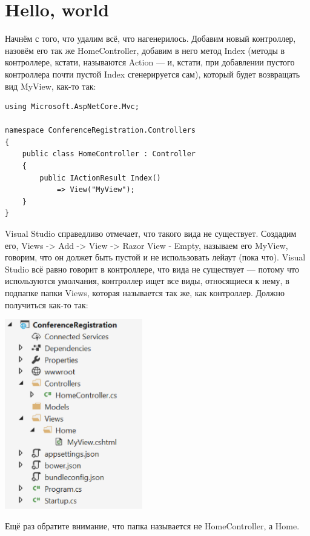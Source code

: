 \documentclass[a5paper]{article}
\begin{document}
\section{Hello, world}

Начнём с того, что удалим всё, что нагенерилось. Добавим новый контроллер, назовём его так же HomeController, добавим в него метод Index (методы в контроллере, кстати, называются Action --- и, кстати, при добавлении пустого контроллера почти пустой Index сгенерируется сам), который будет возвращать вид MyView, как-то так:

\begin{verbatim}
using Microsoft.AspNetCore.Mvc;

namespace ConferenceRegistration.Controllers
{
    public class HomeController : Controller
    {
        public IActionResult Index()
            => View("MyView");
    }
}
\end{verbatim}

Visual Studio справедливо отмечает, что такого вида не существует. Создадим его, Views -> Add -> View -> Razor View - Empty, называем его MyView, говорим, что он должет быть пустой и не использовать лейаут (пока что). Visual Studio всё равно говорит в контроллере, что вида не существует ---
потому что используются умолчания, контроллер ищет все виды, относящиеся к нему, в подпапке папки Views, которая называется так же, как контроллер. Должно получиться как-то так:

\begin{center}
    \includegraphics[width=0.45\textwidth]{projectStructure.png}
\end{center}

Ещё раз обратите внимание, что папка называется не HomeController, а Home.
\end{document}
